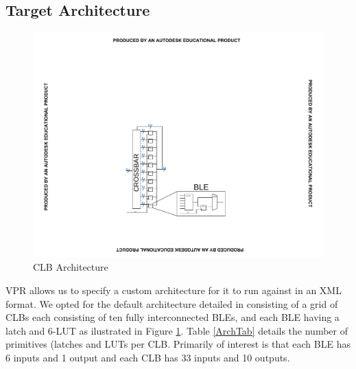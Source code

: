 \documentclass[12pt,final,oneside]{dwThesis} %
\begin{document}
    \subsection{Target
      Architecture} 
   \begin{figure}

      \begin{center}

         \includegraphics[clip,trim=8cm 4cm 8cm 8cm]{images/CLB.pdf}
         \caption{\gls{CLB} Architecture} \label{ArchFig} 
      \end{center}


   \end{figure}
   \gls{VPR} allows us to specify a custom architecture for it to
   run against in an XML format. We opted for the default architecture detailed
   in \cite{VPRManual} consisting of a grid of \glspl{CLB} each consisting of
   ten fully interconnected \glspl{BLE}, and each \gls{BLE} having a latch and
   6-\gls{LUT} as ilustrated in Figure \ref{ArchFig}.  Table \ref{ArchTab}
   details the number of primitives (latches and \glspl{LUT} per \gls{CLB}.
   Primarily of interest is that each \gls{BLE} has 6 inputs and 1 output and
   each \gls{CLB} has 33 inputs and 10 outputs.  


\end{document}
